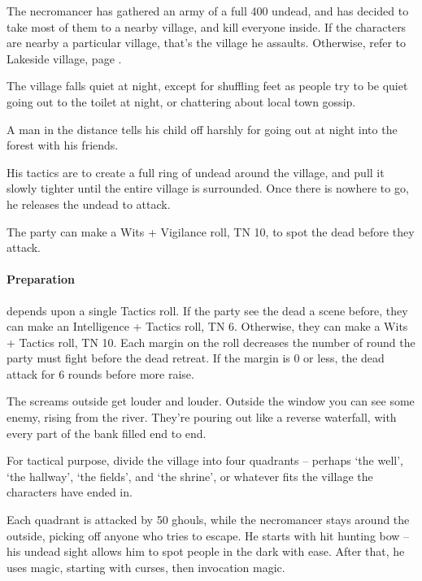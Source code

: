 \begin{multicols}{2}
The necromancer has gathered an army of a full 400 undead, and has decided to take most of them to a nearby village, and kill everyone inside.
If the characters are nearby a particular village, that's the village he assaults.
Otherwise, refer to Lakeside village, page \pageref{lakeside}.

\begin{boxtext}
  The village falls quiet at night, except for shuffling feet as people try to be quiet going out to the toilet at night, or chattering about local town gossip.

  A man in the distance tells his child off harshly for going out at night into the forest with his friends.
\end{boxtext}

His tactics are to create a full ring of undead around the village, and pull it slowly tighter until the entire village is surrounded.
Once there is nowhere to go, he releases the undead to attack.

The party can make a Wits + Vigilance roll, TN 10, to spot the dead before they attack.

\paragraph{Preparation} depends upon a single Tactics roll.
If the party see the dead a scene before, they can make an Intelligence + Tactics roll, TN 6.
Otherwise, they can make a Wits + Tactics roll, TN 10.
Each margin on the roll decreases the number of round the party must fight before the dead retreat.
If the margin is 0 or less, the dead attack for 6 rounds before more raise.

\begin{boxtext}

  The screams outside get louder and louder.
  Outside the window you can see some enemy, rising from the river.
  They're pouring out like a reverse waterfall, with every part of the bank filled end to end.

\end{boxtext}

For tactical purpose, divide the village into four quadrants -- perhaps `the well', `the hallway', `the fields', and `the shrine', or whatever fits the village the characters have ended in.

Each quadrant is attacked by 50 ghouls, while the necromancer stays around the outside, picking off anyone who tries to escape.  He starts with hit hunting bow -- his undead sight allows him to spot people in the dark with ease.  After that, he uses magic, starting with curses, then invocation magic.


\end{multicols}
